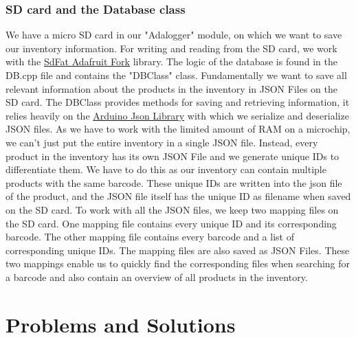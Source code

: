 \documentclass{article}
\begin{document}
\subsubsection{SD card and the Database class}
We have a micro SD card in our "Adalogger" module, on which we want to save our inventory information.
For writing and reading from the SD card, we work with the \href{https://github.com/adafruit/SdFat}{SdFat Adafruit Fork} library.
The logic of the database is found in the DB.cpp file and contains the "DBClass" class. Fundamentally we want to save all relevant information about the products in the inventory in JSON Files on the SD card.
The DBClass provides methods for saving and retrieving information, it relies heavily on the \href{https://github.com/bblanchon/ArduinoJson}{Arduino Json Library} with which we serialize and deserialize JSON files.
As we have to work with the limited amount of RAM on a microchip, we can't just put the entire inventory in a single JSON file.
Instead, every product in the inventory has its own JSON File and we generate unique IDs to differentiate them. We have to do this as our inventory can contain multiple products with the same barcode.
These unique IDs are written into the json file of the product, and the JSON file itself has the unique ID as filename when saved on the SD card.
To work with all the JSON files, we keep two mapping files on the SD card. One mapping file contains every unique ID and its corresponding barcode.
The other mapping file contains every barcode and a list of corresponding unique IDs. The mapping files are also saved as JSON Files.
These two mappings enable us to quickly find the corresponding files when searching for a barcode and also contain an overview of all products in the inventory.

\section{Problems and Solutions}
\end{document}
